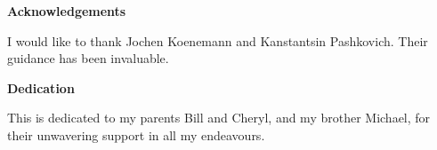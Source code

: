 
\begin{center}\textbf{Acknowledgements}\end{center}

I would like to thank Jochen Koenemann and Kanstantsin Pashkovich. Their guidance has been invaluable.
\cleardoublepage


\begin{center}\textbf{Dedication}\end{center}

This is dedicated to my parents Bill and Cheryl, and my brother Michael, for their unwavering support in all my endeavours.
\cleardoublepage

\renewcommand\contentsname{Table of Contents}
\tableofcontents
\cleardoublepage
{}


\listoffigures
\cleardoublepage
{}		%



